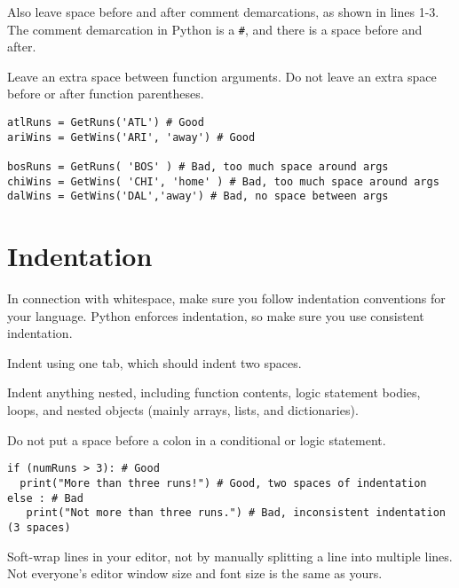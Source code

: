 \documentclass{article}
\begin{document}
Also leave space before and after comment demarcations, as shown in lines 1-3. The comment demarcation in Python is a \verb|#|, and there is a space before and after.

Leave an extra space between function arguments. Do not leave an extra space before or after function parentheses.

\begin{lstlisting}[style=pippython]
atlRuns = GetRuns('ATL') # Good
ariWins = GetWins('ARI', 'away') # Good
 
bosRuns = GetRuns( 'BOS' ) # Bad, too much space around args
chiWins = GetWins( 'CHI', 'home' ) # Bad, too much space around args
dalWins = GetWins('DAL','away') # Bad, no space between args
\end{lstlisting}

\section*{Indentation}

In connection with whitespace, make sure you follow indentation conventions for your language. Python enforces indentation, so make sure you use consistent indentation.

Indent using one tab, which should indent two spaces.

Indent anything nested, including function contents, logic statement bodies, loops, and nested objects (mainly arrays, lists, and dictionaries).

Do not put a space before a colon in a conditional or logic statement.

\begin{lstlisting}[style=pippython]
if (numRuns > 3): # Good
  print("More than three runs!") # Good, two spaces of indentation
else : # Bad
   print("Not more than three runs.") # Bad, inconsistent indentation (3 spaces)
\end{lstlisting}

Soft-wrap lines in your editor, not by manually splitting a line into multiple lines. Not everyone's editor window size and font size is the same as yours. 
\end{document}
